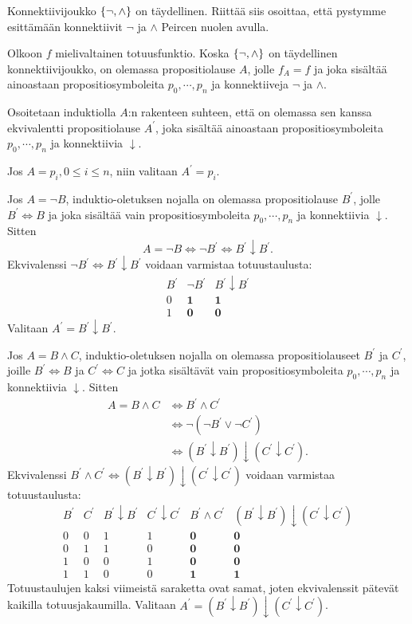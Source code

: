 \documentclass[11pt,a4paper]{amsart}
\begin{document}
\begin{solution}
Konnektiivijoukko \(\left\lbrace\neg, \land\right\rbrace\) on täydellinen. Riittää siis osoittaa,
että pystymme esittämään konnektiivit \(\neg\) ja \(\land\) Peircen
nuolen avulla.

Olkoon \(f\) mielivaltainen totuusfunktio. Koska \(\left\lbrace\neg, \land\right\rbrace\) on
täydellinen konnektiivijoukko, on olemassa propositiolause \(A\), jolle
\(f_A=f\) ja joka sisältää ainoastaan
propositiosymboleita \(p_0, \cdots, p_n\) ja konnektiiveja \(\neg\)
ja \(\land\).

Osoitetaan induktiolla \(A\):n rakenteen suhteen, että on olemassa
sen kanssa ekvivalentti propositiolause \(A^{'}\), joka sisältää ainoastaan
propositiosymboleita \(p_0, \cdots, p_n\) ja konnektiivia \(\downarrow\).

Jos \(A = p_i, 0 \leq i \leq n\), niin valitaan \(A^{'} = p_i\).

Jos \(A = \neg B\), induktio-oletuksen nojalla on olemassa propositiolause
\(B^{'}\), jolle \(B^{'} \iff B\) ja joka sisältää vain
propositiosymboleita \(p_0, \cdots, p_n\) ja
konnektiivia \(\downarrow\). Sitten
\[
A = \neg B \iff \neg B^{'} \iff B^{'} \downarrow B^{'}.
\]
Ekvivalenssi \(\neg B^{'} \iff B^{'} \downarrow B^{'}\) voidaan
varmistaa totuustaulusta:
\[
\begin{array}{c|cc}
B^{'} & \neg B^{'} & B^{'} \downarrow B^{'} \\
\hline
0 & \mathbf{1} & \mathbf{1} \\
1 & \mathbf{0} & \mathbf{0}
\end{array}
\]
Valitaan \(A^{'} = B^{'} \downarrow B^{'}\).

Jos \(A = B \land C\), induktio-oletuksen nojalla on olemassa propositiolauseet
\(B^{'}\) ja \(C^{'}\), joille \(B^{'} \iff B\) ja \(C^{'} \iff C\) ja
jotka sisältävät vain propositiosymboleita \(p_0, \cdots, p_n\) ja
konnektiivia \(\downarrow\). Sitten
\[
\begin{aligned}
A = B \land C &\iff B^{'} \land C^{'} \\
&\iff \neg (\neg B^{'} \lor \neg C^{'}) \\
&\iff (B^{'} \downarrow B^{'}) \downarrow (C^{'} \downarrow C^{'}).
\end{aligned}
\]
Ekvivalenssi \(B^{'} \land C^{'} \iff
(B^{'} \downarrow B^{'}) \downarrow (C^{'} \downarrow C^{'})\)
voidaan varmistaa totuustaulusta:
\[
\begin{array}{cc|cc|cc}
B^{'} & C^{'} & B^{'} \downarrow B^{'} & C^{'} \downarrow C^{'}
& B^{'} \land C^{'}
& (B^{'} \downarrow B^{'}) \downarrow (C^{'} \downarrow C^{'}) \\
\hline
0 & 0 & 1 & 1 & \mathbf{0} & \mathbf{0} \\
0 & 1 & 1 & 0 & \mathbf{0} & \mathbf{0} \\
1 & 0 & 0 & 1 & \mathbf{0} & \mathbf{0} \\
1 & 1 & 0 & 0 & \mathbf{1} & \mathbf{1}
\end{array}
\]
Totuustaulujen kaksi viimeistä saraketta ovat samat, joten ekvivalenssit
pätevät kaikilla totuusjakaumilla.
Valitaan \(A^{'} = (B^{'} \downarrow B^{'}) \downarrow (C^{'}
\downarrow C^{'})\).


\end{solution}
\end{document}

